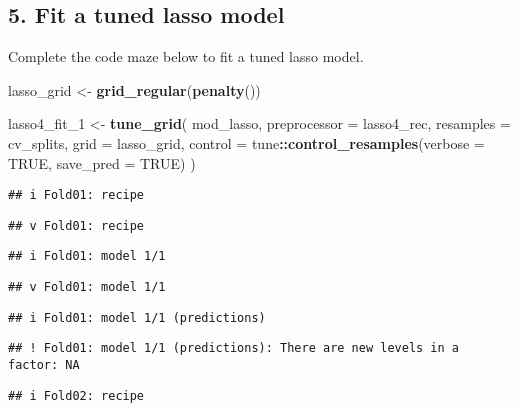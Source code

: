 \documentclass[
]{article}
\newenvironment{Shaded}{\begin{snugshade}}{\end{snugshade}}
\newcommand{\DataTypeTok}[1]{\textcolor[rgb]{0.13,0.29,0.53}{#1}}
\newcommand{\DecValTok}[1]{\textcolor[rgb]{0.00,0.00,0.81}{#1}}
\newcommand{\KeywordTok}[1]{\textcolor[rgb]{0.13,0.29,0.53}{\textbf{#1}}}
\newcommand{\NormalTok}[1]{#1}
\newcommand{\OperatorTok}[1]{\textcolor[rgb]{0.81,0.36,0.00}{\textbf{#1}}}
\newcommand{\OtherTok}[1]{\textcolor[rgb]{0.56,0.35,0.01}{#1}}
\newcommand{\StringTok}[1]{\textcolor[rgb]{0.31,0.60,0.02}{#1}}
\begin{document}
\hypertarget{fit-a-tuned-lasso-model}{%
\subsection{5. Fit a tuned lasso model}\label{fit-a-tuned-lasso-model}}

Complete the code maze below to fit a tuned lasso model.

\begin{Shaded}
\begin{Highlighting}[]
\NormalTok{lasso_grid <-}\StringTok{ }\KeywordTok{grid_regular}\NormalTok{(}\KeywordTok{penalty}\NormalTok{())}

\NormalTok{lasso4_fit_}\DecValTok{1}\NormalTok{ <-}\StringTok{ }\KeywordTok{tune_grid}\NormalTok{(}
\NormalTok{  mod_lasso,}
  \DataTypeTok{preprocessor =}\NormalTok{ lasso4_rec,}
  \DataTypeTok{resamples =}\NormalTok{ cv_splits,}
  \DataTypeTok{grid =}\NormalTok{ lasso_grid,}
  \DataTypeTok{control =}\NormalTok{ tune}\OperatorTok{::}\KeywordTok{control_resamples}\NormalTok{(}\DataTypeTok{verbose =} \OtherTok{TRUE}\NormalTok{,}
                                    \DataTypeTok{save_pred =} \OtherTok{TRUE}\NormalTok{)}
\NormalTok{)}
\end{Highlighting}
\end{Shaded}

\begin{verbatim}
## i Fold01: recipe
\end{verbatim}

\begin{verbatim}
## v Fold01: recipe
\end{verbatim}

\begin{verbatim}
## i Fold01: model 1/1
\end{verbatim}

\begin{verbatim}
## v Fold01: model 1/1
\end{verbatim}

\begin{verbatim}
## i Fold01: model 1/1 (predictions)
\end{verbatim}

\begin{verbatim}
## ! Fold01: model 1/1 (predictions): There are new levels in a factor: NA
\end{verbatim}

\begin{verbatim}
## i Fold02: recipe
\end{verbatim}
\end{document}
